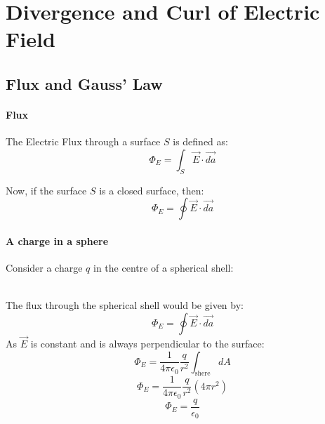 \documentclass{article}
\begin{document}
\section{Divergence and Curl of Electric Field}
\subsection{Flux and Gauss' Law}
\paragraph{Flux}
The Electric Flux through a surface $S$ is defined as:
\[\Phi_E = \int_{S} \vec{E} \cdot \vec{da}\]

Now, if the surface $S$ is a closed surface, then:
\[\Phi_E = \oint \vec{E} \cdot \vec{da}\]

\paragraph*{A charge in a sphere}
Consider a charge $q$ in the centre of a spherical shell:\\

\\
The flux through the spherical shell would be given by:
\[ \Phi_E = \oint \vec{E} \cdot \vec{da} \]
As $\vec{E}$ is constant and is always perpendicular to the surface:
\[ \Phi_E = \frac{1}{4 \pi \epsilon_0} \frac{q}{r^2} \int_{\text{shere}} dA\]
\[ \Phi_E = \frac{1}{4 \pi \epsilon_0} \frac{q}{r^2} (4 \pi r^2)\]
\[ \Phi_E = \frac{q}{\epsilon_0}\]
\end{document}
